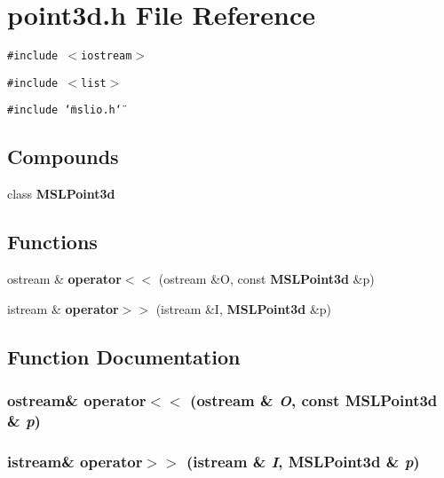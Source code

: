 \section{point3d.h File Reference}
\label{point3d_8h}
{\tt \#include $<$iostream$>$}\par
{\tt \#include $<$list$>$}\par
{\tt \#include \char`\"{}mslio.h\char`\"{}}\par
\subsection*{Compounds}
\begin{CompactItemize}
\item 
class {\bf MSLPoint3d}
\end{CompactItemize}
\subsection*{Functions}
\begin{CompactItemize}
\item 
ostream \& {\bf operator$<$$<$} (ostream \&O, const {\bf MSLPoint3d} \&p)
\item 
istream \& {\bf operator$>$$>$} (istream \&I, {\bf MSLPoint3d} \&p)
\end{CompactItemize}


\subsection{Function Documentation}
\subsubsection{\setlength{\rightskip}{0pt plus 5cm}ostream\& operator$<$$<$ (ostream \& {\em O}, const {\bf MSLPoint3d} \& {\em p})}\label{point3d_8h_a0}


\subsubsection{\setlength{\rightskip}{0pt plus 5cm}istream\& operator$>$$>$ (istream \& {\em I}, {\bf MSLPoint3d} \& {\em p})}\label{point3d_8h_a1}


